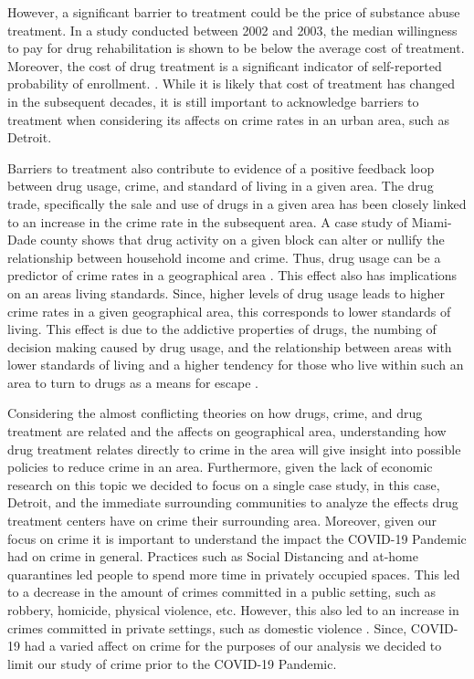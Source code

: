 \documentclass[12pt]{article}
\begin{document}
However, a significant barrier to treatment could be the price of substance abuse treatment. In a study conducted between 2002 and 2003, the median willingness to pay for drug rehabilitation is shown to be below the average cost of treatment. Moreover, the cost of drug treatment is a significant indicator of self-reported probability of enrollment. \cite{cost_of_drug_treatment}. While it is likely that cost of treatment has changed in the subsequent decades, it is still important to acknowledge barriers to treatment when considering its affects on crime rates in an urban area, such as Detroit. 

Barriers to  treatment also contribute to evidence of a positive feedback loop between drug usage, crime, and standard of living in a given area. The drug trade, specifically the sale and use of drugs in a given area has been closely linked to an increase in the crime rate in the subsequent area. A case study of Miami-Dade county shows that drug activity on a given block can alter or nullify the relationship between household income and crime. Thus, drug usage can be a predictor of crime rates in a geographical area \cite{drugs_crime_space_time}. This effect also has implications on an areas living standards. Since, higher levels of drug usage leads to higher crime rates in a given geographical area, this corresponds to lower standards of living. This effect is due to the addictive properties of drugs, the numbing of decision making caused by drug usage, and the relationship between areas with lower standards of living and a higher tendency for those who live within such an area to turn to drugs as a means for escape \cite{drugs_and_crime}.

Considering the almost conflicting theories on how drugs, crime, and drug treatment are related and the affects on geographical area, understanding how drug treatment relates directly to crime in the area will give insight into possible policies to reduce crime in an area. Furthermore, given the lack of economic research on this topic we decided to focus on a single case study, in this case, Detroit, and the immediate surrounding communities to analyze the effects drug treatment centers have on crime their surrounding area. Moreover, given our focus on crime it is important to understand the impact the COVID-19 Pandemic had on crime in general. Practices such as Social Distancing and at-home quarantines led people to spend more time in privately occupied spaces. This led to a decrease in the amount of crimes committed in a public setting, such as robbery, homicide, physical violence, etc. However, this also led to an increase in crimes committed in private settings, such as domestic violence \cite{covid_and_crime}. Since, COVID-19 had a varied affect on crime for the purposes of our analysis we decided to limit our study of crime prior to the COVID-19 Pandemic.
\end{document}
